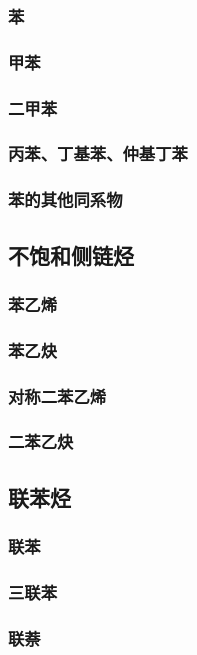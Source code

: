 \documentclass[UTF8]{../03-Chemistry}
\begin{document}
        \subsubsection{苯}
        \subsubsection{甲苯}
        \subsubsection{二甲苯}
        \subsubsection{丙苯、丁基苯、仲基丁苯}
        \subsubsection{苯的其他同系物}
    \subsection{不饱和侧链烃}
        \subsubsection{苯乙烯}
        \subsubsection{苯乙炔}
        \subsubsection{对称二苯乙烯}
        \subsubsection{二苯乙炔}
    \subsection{联苯烃}
        \subsubsection{联苯}
        \subsubsection{三联苯}
        \subsubsection{联萘}
\end{document}
